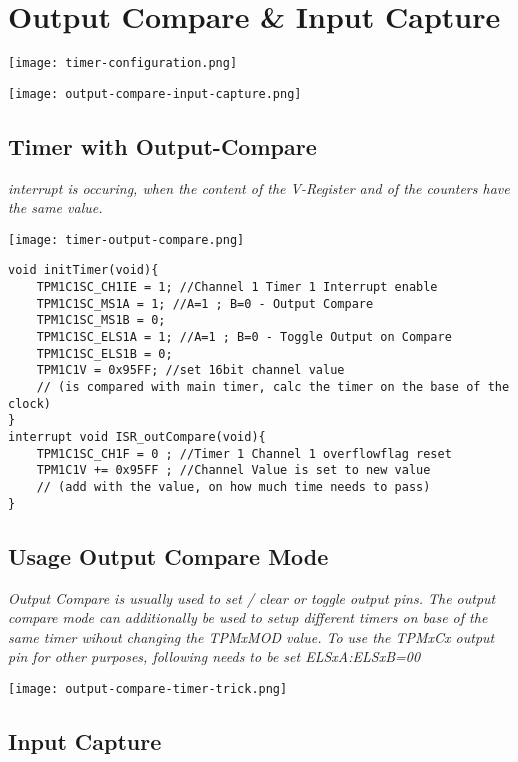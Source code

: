 \section{Output Compare \& Input Capture}

\texttt{[image: timer-configuration.png]}

\texttt{[image: output-compare-input-capture.png]}

\subsection{Timer with Output-Compare}

\textit{
    interrupt is occuring, when the content of the V-Register and
    of the counters have the same value.
}

\texttt{[image: timer-output-compare.png]}

\begin{lstlisting}
void initTimer(void){
    TPM1C1SC_CH1IE = 1; //Channel 1 Timer 1 Interrupt enable
    TPM1C1SC_MS1A = 1; //A=1 ; B=0 - Output Compare
    TPM1C1SC_MS1B = 0;
    TPM1C1SC_ELS1A = 1; //A=1 ; B=0 - Toggle Output on Compare
    TPM1C1SC_ELS1B = 0;
    TPM1C1V = 0x95FF; //set 16bit channel value
    // (is compared with main timer, calc the timer on the base of the clock)
}
interrupt void ISR_outCompare(void){
    TPM1C1SC_CH1F = 0 ; //Timer 1 Channel 1 overflowflag reset
    TPM1C1V += 0x95FF ; //Channel Value is set to new value
    // (add with the value, on how much time needs to pass)
}
\end{lstlisting}

\subsection{Usage Output Compare Mode}

\textit{
    Output Compare is usually used to set / clear or toggle output pins.
    \newline
    The output compare mode can additionally be used to setup
    different timers on base of the same timer wihout
    changing the TPMxMOD value. To use the TPMxCx output pin for other
    purposes, following needs to be set ELSxA:ELSxB=00
}

\texttt{[image: output-compare-timer-trick.png]}

\subsection{Input Capture}

